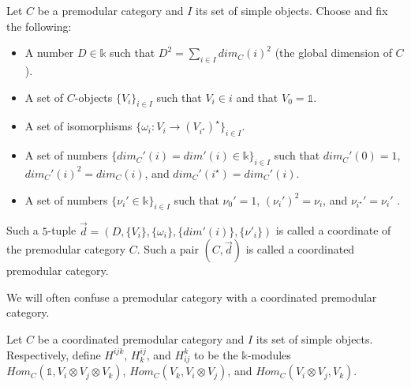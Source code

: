 \begin{definition}\label{def/coordinated-premodular-category}
  Let $C$ be a premodular category and $I$ its set of simple objects.
  Choose and fix the following:
  \begin{itemize}
    \item A number $D \in \mathbb{k}$ such that
          $D^{2} = \sum_{i \in I} dim_{C}(i)^{2}$ (the global
          dimension of $C$).
    \item A set of $C$-objects $\{V_{i}\}_{i \in I}$ such
          that $V_{i} \in i$ and that $V_{0} = \mathbb{1}$.
    \item A set of isomorphisms
          \cite[p.313]{turaev-qiok-3-manifolds}
          $\{\omega_{i}: V_{i} \to (V_{i^{\star}})^{\star}\}_{i \in I}$.
    \item A set of numbers
          $\{dim_{C}'(i) = dim'(i) \in \mathbb{k}\}_{i \in I}$
          such that $dim_{C}'(0) = 1$,
          $dim_{C}'(i)^{2} = dim_{C}(i)$, and
          $dim_{C}'(i^{\star}) = dim_{C}'(i)$.
    \item A set of numbers
          $\{\nu_{i}' \in \mathbb{k}\}_{i \in I}$ such that
          $\nu_{0}' = 1$, $(\nu_{i}')^{2} = \nu_{i}$, and
          $\nu_{i^{\star}}' = \nu_{i}'$
          \cite[p.313]{turaev-qiok-3-manifolds}.
  \end{itemize}

  Such a $5$-tuple
  $\vec{d} = (D, \{V_{i}\}, \{\omega_{i}\}, \{dim'(i)\}, \{\nu'_{i}\})$
  is called a coordinate of the premodular category $C$. Such a
  pair $(C, \vec{d})$ is called a coordinated premodular
  category.
\end{definition}

\noindent We will often confuse a premodular category with a
coordinated premodular category.

\begin{definition}\label{def/multiplicity-module}
  Let $C$ be a coordinated premodular category and $I$ its set
  of simple objects. Respectively, define $H^{ijk}$, $H_{k}^{ij}$, and
  $H_{ij}^{k}$ to be the $\mathbb{k}$-modules
  $Hom_{C}(\mathbb{1}, V_{i} \otimes V_{j} \otimes V_{k})$,
  $Hom_{C}(V_{k}, V_{i} \otimes V_{j})$, and
  $Hom_{C}(V_{i} \otimes V_{j}, V_{k})$.
\end{definition}

